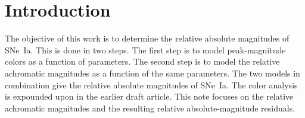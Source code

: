 \documentclass{aastex61}   	%
\begin{document}
% 
%    
%    
%     
% 
% 
%
%
%
%
%   
%    


%

\section{Introduction}
The objective of this work is to determine the relative absolute magnitudes of SNe~Ia.  This is done in two steps.
The first step is to model peak-magnitude colors as a function of parameters.  The second step is to model the relative achromatic magnitudes
as a function of the same parameters.
The two models in combination give the  relative absolute magnitudes of SNe~Ia.
The color analysis is expounded upon in the earlier draft article.  This note focuses on the relative achromatic magnitudes
and the resulting relative absolute-magnitude residuals.
\end{document}
